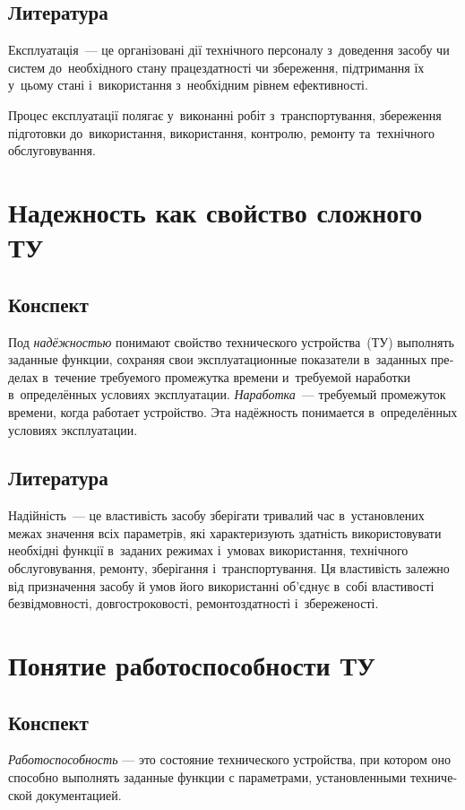 \documentclass[
	a4paper,
	oneside,
	DIV = 14,
	fontsize = 14pt,
	headings = normal,
]{scrartcl}
\begin{document}
		\subsection{Литература}
			Експлуатація~— це організовані дії технічного персоналу з~доведення засобу чи систем до~необхідного стану працездатності чи збереження, підтримання їх у~цьому стані і~використання з~необхідним рівнем ефективності.

			Процес експлуатації полягає у~виконанні робіт з~транспортування, збереження підготовки до~використання, використання, контролю, ремонту та~технічного обслуговування.

	\section{Надежность как свойство сложного ТУ}
	\begin{russian}
		\subsection{Конспект}
			Под \emph{надёжностью} понимают свойство технического устройства~(ТУ) выполнять заданные функции, сохраняя свои эксплуатационные показатели в~заданных пределах в~течение требуемого промежутка времени и~требуемой наработки в~определённых условиях эксплуатации. \emph{Наработка}~— требуемый промежуток времени, когда работает устройство. Эта надёжность понимается в~определённых условиях эксплуатации.
	\end{russian}

		\subsection{Литература}
			Надійність~— це властивість засобу зберігати тривалий час в~установлених межах значення всіх параметрів, які характеризують здатність використовувати необхідні функції в~заданих режимах і~умовах використання, технічного обслуговування, ремонту, зберігання і~транспортування. Ця властивість залежно від призначення засобу й умов його використанні об'єднує в~собі властивості безвідмовності, довгостроковості, ремонтоздатності і~збереженості.

	\section{Понятие работоспособности ТУ}
		\subsection{Конспект}
		\begin{russian}
			\emph{Работоспособность} — это состояние технического устройства, при котором оно способно выполнять заданные функции с параметрами, установленными технической документацией. 
		\end{russian}
\end{document}
